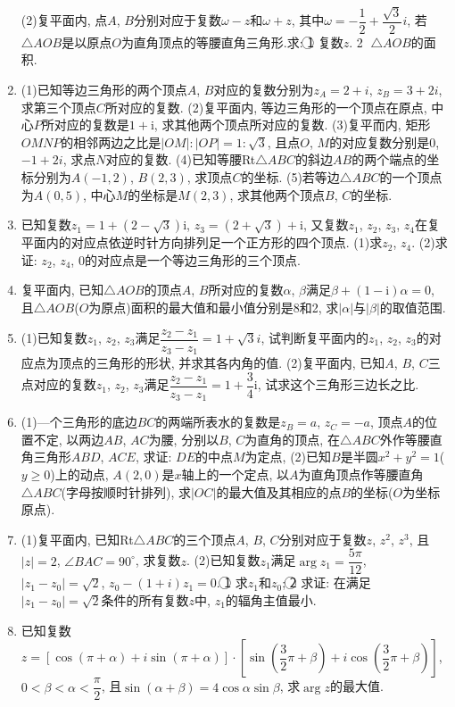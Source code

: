 \documentclass[10pt,a4paper]{article}
\begin{document}
\begin{enumerate}[1.]
(2)复平面内, 点$A$, $B$分别对应于复数$\omega -z$和$\omega +z$, 其中$\omega =-\dfrac 12+\dfrac{\sqrt 3}2i$, 若$\triangle AOB$是以原点$O$为直角顶点的等腰直角三角形.求:
\textcircled{1} 复数$z$.							\textcircled{2} $\triangle AOB$的面积.
\item (1)已知等边三角形的两个顶点$A$, $B$对应的复数分别为$z_A=2+i$, $z_B=3+2i$, 求第三个顶点$C$所对应的复数.
(2)复平面内, 等边三角形的一个顶点在原点, 中心$P$所对应的复数是$1+\mathrm{i}$, 求其他两个顶点所对应的复数.
(3)复平而内, 矩形$OMNP$的相邻两边之比是$|OM|:|OP|=1:\sqrt 3$, 且点$O$, $M$的对应复数分别是0, $-1+2i$, 求点$N$对应的复数.
(4)已知等腰Rt$\triangle ABC$的斜边$AB$的两个端点的坐标分别为$A(-1,2)$, $B(2,3)$, 求顶点$C$的坐标.
(5)若等边$\triangle ABC$的一个顶点为$A(0,5)$, 中心$M$的坐标是$M(2,3)$, 求其他两个顶点$B$, $C$的坐标.
\item 已知复数$z_1=1+(2-\sqrt 3)\mathrm{i}$, $z_3=(2+\sqrt 3)+\mathrm{i}$, 又复数$z_1$, $z_2$, $z_3$, $z_4$在复平面内的对应点依逆时针方向排列足一个正方形的四个顶点.
(1)求$z_2$, $z_4$.
(2)求证: $z_2$, $z_4$, 0的对应点是一个等边三角形的三个顶点.
\item 复平面内, 已知$\triangle AOB$的顶点$A$, $B$所对应的复数$\alpha$, $\beta$满足$\beta +(1-\mathrm{i})\alpha =0$, 且$\triangle AOB$($O$为原点)面积的最大值和最小值分别是8和2, 求$|\alpha|$与$|\beta|$的取值范围.
\item (1)已知复数$z_1$, $z_2$, $z_3$满足$\dfrac{{z_2}-{z_1}}{{z_3}-{z_1}}=1+\sqrt 3i$, 试判断复平面内的$z_1$, $z_2$, $z_3$的对应点为顶点的三角形的形状, 并求其各内角的值.
(2)复平面内, 已知$A$, $B$, $C$三点对应的复数$z_1$, $z_2$, $z_3$满足$\dfrac{{z_2}-{z_1}}{{z_3}-{z_1}}=1+\dfrac 34\mathrm{i}$, 试求这个三角形三边长之比.
\item (1)—个三角形的底边$BC$的两端所表水的复数是$z_B=a$, $z_C=-a$, 顶点$A$的位置不定, 以两边$AB$, $AC$为腰, 分别以$B$, $C$为直角的顶点, 在$\triangle ABC$外作等腰直角三角形$ABD$, $ACE$, 求证: $DE$的中点$M$为定点,
(2)已知$B$是半圆$x^2+y^2=1$($y\ge 0$)上的动点, $A(2,0)$是$x$轴上的一个定点, 以$A$为直角顶点作等腰直角$\triangle ABC$(字母按顺时针排列), 求$|OC|$的最大值及其相应的点$B$的坐标($O$为坐标原点).
\item (1)复平面内, 已知Rt$\triangle ABC$的三个顶点$A$, $B$, $C$分别对应于复数$z$, $z^2$, $z^3$, 且$|z|=2$, $\angle BAC=90^{\circ }$, 求复数$z$.
(2)已知复数$z_1$满足$\arg z_1=\dfrac{5\pi }{12}$, $|z_1-z_0|=\sqrt 2$, $z_0-(1+i)z_1=0$.
\textcircled{1} 求$z_1$和$z_0$;
\textcircled{2} 求证: 在满足$|z_1-z_0|=\sqrt 2$条件的所有复数$z$中, $z_1$的辐角主值最小.
\item 已知复数$z=[\cos (\pi +\alpha)+i\sin (\pi +\alpha)]\cdot [\sin (\dfrac 32\pi +\beta)+i\cos (\dfrac 32\pi +\beta)]$, $0<\beta <\alpha <\dfrac{\pi }2$, 且$\sin (\alpha +\beta)=4\cos \alpha \sin \beta$, 求$\arg z$的最大值.

\end{enumerate}
\end{document}
